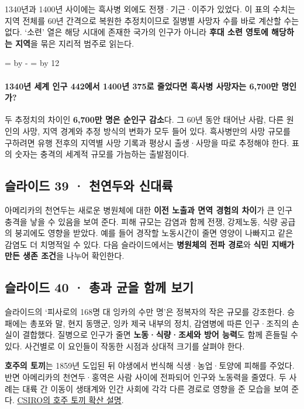 \documentclass[10pt,a4paper]{article}
\newcommand{\ReserveQuestionSpace}{%
  \par\begingroup
  \dimen0=\pagegoal \advance\dimen0 by -\pagetotal
  \dimen2=\baselineskip \multiply\dimen2 by 12
  \ifdim\dimen0<\dimen2 \newpage\fi
  \endgroup}
\begin{document}
1340년과 1400년 사이에는 흑사병 외에도 전쟁·기근·이주가 있었다. 이 표의 수치는 지역 전체를 60년 간격으로 복원한 추정치이므로 질병별 사망자 수를 바로 계산할 수는 없다. ‘소련’ 열은 해당 시대에 존재한 국가의 인구가 아니라 \textbf{후대 소련 영토에 해당하는 지역}을 묶은 지리적 범주로 읽는다.\par

\ReserveQuestionSpace
\paragraph{1340년 세계 인구 442에서 1400년 375로 줄었다면 흑사병 사망자는 6,700만 명인가?}
두 추정치의 차이인 \textbf{6,700만 명은 순인구 감소}다. 그 60년 동안 태어난 사람, 다른 원인의 사망, 지역 경계와 추정 방식의 변화가 모두 들어 있다. 흑사병만의 사망 규모를 구하려면 유행 전후의 지역별 사망 기록과 평상시 출생·사망을 따로 추정해야 한다. 표의 숫자는 충격의 세계적 규모를 가늠하는 출발점이다.\par

\subsection{슬라이드 39 · 천연두와 신대륙}
아메리카의 천연두는 새로운 병원체에 대한 \textbf{이전 노출과 면역 경험의 차이}가 큰 인구 충격을 낳을 수 있음을 보여 준다. 피해 규모는 감염과 함께 전쟁, 강제노동, 식량 공급의 붕괴에도 영향을 받았다. 예를 들어 경작할 노동시간이 줄면 영양이 나빠지고 같은 감염도 더 치명적일 수 있다. 다음 슬라이드에서는 \textbf{병원체의 전파 경로}와 \textbf{식민 지배가 만든 생존 조건}을 나누어 확인한다.\par

\subsection{슬라이드 40 · 총과 균을 함께 보기}
슬라이드의 ‘피사로의 168명 대 잉카의 수만 명’은 정복자의 작은 규모를 강조한다. 승패에는 총포와 말, 현지 동맹군, 잉카 제국 내부의 정치, 감염병에 따른 인구·조직의 손실이 결합했다. 질병으로 인구가 줄면 \textbf{노동·식량·조세와 방어 능력}도 함께 흔들릴 수 있다. 사건별로 이 요인들이 작동한 시점과 상대적 크기를 살펴야 한다.\par

\textbf{호주의 토끼}는 1859년 도입된 뒤 야생에서 번식해 식생·농업·토양에 피해를 주었다. 반면 아메리카의 천연두·홍역은 사람 사이에 전파되어 인구와 노동력을 줄였다. 두 사례는 대륙 간 이동이 생태계와 인간 사회에 각각 다른 경로로 영향을 준 모습을 보여 준다. \href{https://www.csiro.au/en/research/animals/pests/Biological-control-of-rabbits}{CSIRO의 호주 토끼 확산 설명}.\par
\end{document}
